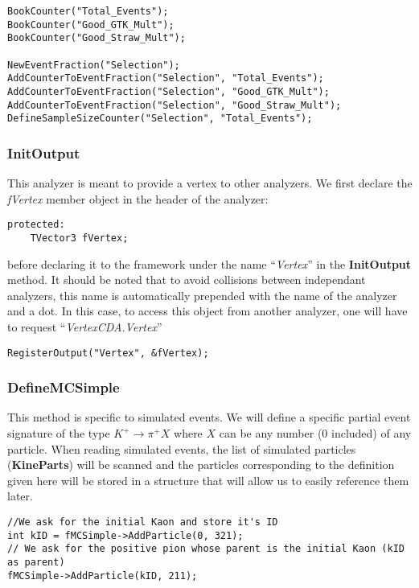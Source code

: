 \documentclass{article}
\newcommand{\method}[1]{\textbf{#1}}
\newcommand{\var}[1]{\textit{#1}}
\newcommand{\class}[1]{\textbf{#1}}
\newcommand{\refcode}[1]{``\textit{#1}''}
\begin{document}
\begin{lstlisting}
BookCounter("Total_Events");
BookCounter("Good_GTK_Mult");
BookCounter("Good_Straw_Mult");

NewEventFraction("Selection");
AddCounterToEventFraction("Selection", "Total_Events");
AddCounterToEventFraction("Selection", "Good_GTK_Mult");
AddCounterToEventFraction("Selection", "Good_Straw_Mult");
DefineSampleSizeCounter("Selection", "Total_Events");
\end{lstlisting} 

\subsubsection{InitOutput}
This analyzer is meant to provide a vertex to other analyzers. We first declare the \var{fVertex}
member object in the header of the analyzer:

\begin{lstlisting}
protected:
	TVector3 fVertex;
\end{lstlisting}
before declaring it to the framework under the name \refcode{Vertex} in the \method{InitOutput}
method. It should be noted that to avoid collisions between independant analyzers, this name is
automatically prepended with the name of the analyzer and a dot. In this case, to access this
object from another analyzer, one will have to request \refcode{VertexCDA.Vertex}

\begin{lstlisting}
RegisterOutput("Vertex", &fVertex);
\end{lstlisting}

\subsubsection{DefineMCSimple}
This method is specific to simulated events. We will define a specific partial event signature of
the type $K^+\to\pi^+X$ where $X$ can be any number (0 included) of any particle. When reading simulated
events, the list of simulated particles (\class{KineParts}) will be scanned and the particles
corresponding to the definition given here will be stored in a structure that will allow us to easily reference
them later.

\begin{lstlisting}
//We ask for the initial Kaon and store it's ID
int kID = fMCSimple->AddParticle(0, 321);
// We ask for the positive pion whose parent is the initial Kaon (kID as parent)
fMCSimple->AddParticle(kID, 211);
\end{lstlisting}
\end{document}
